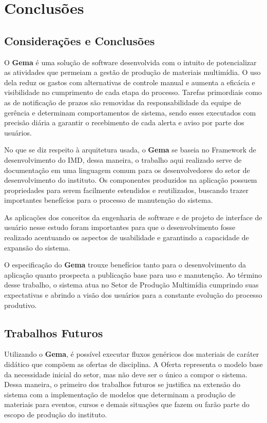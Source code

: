 \chapter{Conclusões}

\section{Considerações e Conclusões}

O \textbf{Gema} é uma solução de software desenvolvida com o intuito de potencializar as atividades que permeiam a gestão de produção de materiais multimídia. O uso dela reduz os gastos com alternativas de controle manual e aumenta a eficácia e visibilidade no cumprimento de cada etapa do processo. Tarefas primordiais como as de notificação de prazos são removidas da responsabilidade da equipe de gerência e determinam comportamentos de sistema, sendo esses executados com precisão diária a garantir o recebimento de cada alerta e aviso por parte dos usuários.

No que se diz respeito à arquitetura usada, o \textbf{Gema} se baseia no Framework de desenvolvimento do IMD, dessa maneira, o trabalho aqui realizado serve de documentação em uma linguagem comum para os desenvolvedores do setor de desenvolvimento do instituto. Os componentes produzidos na aplicação possuem propriedades para serem facilmente estendidos e reutilizados, buscando trazer importantes benefícios para o processo de manutenção do sistema.

As aplicações dos conceitos da engenharia de software e de projeto de interface de usuário nesse estudo foram importantes para que o desenvolvimento fosse realizado acentuando os aspectos de usabilidade e garantindo a capacidade de expansão do sistema. 

O especificação do \textbf{Gema} trouxe benefícios tanto para o desenvolvimento da aplicação  quanto prospecta a publicação base para uso e manutenção. Ao término desse trabalho, o sistema atua no Setor de Produção Multimídia cumprindo suas expectativas e abrindo a visão dos usuários para a constante evolução do processo produtivo. 

\section{Trabalhos Futuros}

Utilizando o \textbf{Gema}, é possível executar fluxos genéricos dos materiais de caráter didático que compõem as ofertas de disciplina. A Oferta representa o modelo base da necessidade inicial do setor, mas não deve ser o único a compor o sistema. Dessa maneira, o primeiro dos trabalhos futuros se justifica na extensão do sistema com a implementação de modelos que determinam a produção de materiais para eventos, cursos e demais situações que fazem ou farão parte do escopo de produção do instituto.

